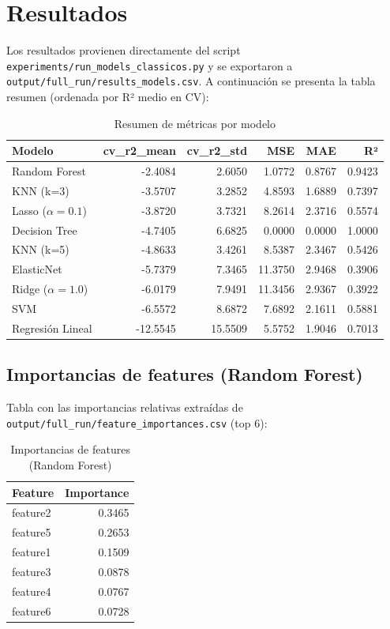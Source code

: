 \documentclass[11pt,a4paper]{article}
\begin{document}
\section{Resultados}
Los resultados provienen directamente del script \texttt{experiments/run\_models\_classicos.py} y se exportaron a \verb|output/full_run/results_models.csv|. A continuación se presenta la tabla resumen (ordenada por R² medio en CV):

\begin{table}[ht]
\centering
\caption{Resumen de métricas por modelo}
\begin{tabular}{lrrrrr}
\toprule
Modelo & cv\_r2\_mean & cv\_r2\_std & MSE & MAE & R² \\
\midrule
Random Forest & -2.4084 & 2.6050 & 1.0772 & 0.8767 & 0.9423 \\
KNN (k=3) & -3.5707 & 3.2852 & 4.8593 & 1.6889 & 0.7397 \\
Lasso (\(\alpha=0.1\)) & -3.8720 & 3.7321 & 8.2614 & 2.3716 & 0.5574 \\
Decision Tree & -4.7405 & 6.6825 & 0.0000 & 0.0000 & 1.0000 \\
KNN (k=5) & -4.8633 & 3.4261 & 8.5387 & 2.3467 & 0.5426 \\
ElasticNet & -5.7379 & 7.3465 & 11.3750 & 2.9468 & 0.3906 \\
Ridge (\(\alpha=1.0\)) & -6.0179 & 7.9491 & 11.3456 & 2.9367 & 0.3922 \\
SVM & -6.5572 & 8.6872 & 7.6892 & 2.1611 & 0.5881 \\
Regresión Lineal & -12.5545 & 15.5509 & 5.5752 & 1.9046 & 0.7013 \\
\bottomrule
\end{tabular}
\label{tab:resultados}
\end{table}

\subsection{Importancias de features (Random Forest)}
Tabla con las importancias relativas extraídas de \verb|output/full_run/feature_importances.csv| (top 6):
\begin{table}[ht]
\centering
\caption{Importancias de features (Random Forest)}
\begin{tabular}{lr}
\toprule
Feature & Importance \\
\midrule
feature2 & 0.3465 \\
feature5 & 0.2653 \\
feature1 & 0.1509 \\
feature3 & 0.0878 \\
feature4 & 0.0767 \\
feature6 & 0.0728 \\
\bottomrule
\end{tabular}
\label{tab:importancias}
\end{table}
\end{document}
